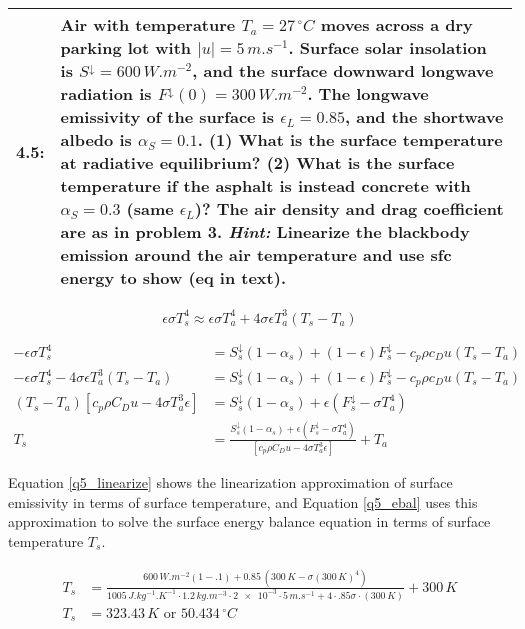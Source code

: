 \documentclass[12pt]{article}
\newcommand*{\problem}[2]{
    \begin{table}[ht]
    \centering
        \begin{tabular}{ | p{.1\linewidth} p{.9\linewidth} | }
            \hline
            \vspace{.3em}\textbf{\large#1:} & \vspace{.3em}\small{#2}\hspace{.2em}\vspace{.5em} \\ \hline
        \end{tabular}
    \end{table}
}
\begin{document}
\problem{4.5}{
    Air with temperature $T_a = 27\,^\circ\si{C}$ moves across a dry parking lot with $|u|=5\,\si{m.s^{-1}}$.
    Surface solar insolation is $S^\downarrow = 600\,\si{W.m^{-2}}$, and the surface downward longwave radiation is $F^\downarrow(0)=300\,\si{W.m^{-2}}$.
    The longwave emissivity of the surface is $\epsilon_L = 0.85$, and the shortwave albedo is $\alpha_S = 0.1$.
    \textbf{(1)} What is the surface temperature at radiative equilibrium?
    \textbf{(2)} What is the surface temperature if the asphalt is instead concrete with $\alpha_S = 0.3$ (same $\epsilon_L$)?
    The air density and drag coefficient are as in problem 3.
    \textit{Hint:} Linearize the blackbody emission around the air temperature and use sfc energy to show (eq in text).
    }%

\begin{equation}\label{q5_linearize}
    \epsilon\sigma T_s^4 \approx \epsilon\sigma T_a^4 + 4\sigma\epsilon T^3_a (T_s - T_a )
\end{equation}

\begin{equation}\label{q5_ebal}
    \begin{split}
        -\epsilon\sigma T_s^4 &= S_s^\downarrow (1-\alpha_s) + (1-\epsilon) F^\downarrow_s -  c_p\rho c_D u (T_s - T_a) \\
        -\epsilon\sigma T_s^4 - 4\sigma\epsilon T^3_a (T_s - T_a )&=  S_s^\downarrow (1-\alpha_s) + (1-\epsilon) F^\downarrow_s -  c_p\rho c_D u (T_s - T_a) \\
        (T_s - T_a )[c_p\rho C_D u - 4\sigma T^3_a \epsilon] &=  S_s^\downarrow (1-\alpha_s) + \epsilon (F^\downarrow_s - \sigma T_a^4) \\
        T_s &=  \frac{S_s^\downarrow (1-\alpha_s) + \epsilon (F^\downarrow_s - \sigma T_a^4)}{[c_p\rho C_D u - 4\sigma T^3_a \epsilon]} + T_a
    \end{split}
\end{equation}

Equation \ref{q5_linearize} shows the linearization approximation of surface emissivity in terms of surface temperature, and Equation \ref{q5_ebal}
uses this approximation to solve the surface energy balance equation in terms of surface temperature $T_s$.

\begin{equation}\label{q5_sol1}
    \begin{split}
        T_s &= \frac{600\,\si{W.m^{-2}}(1-.1)+0.85\,(300\,\si{K}-\sigma(300\,\si{K})^4)}{1005\,\si{J.kg^{-1}.K^{-1}}\cdot1.2\,\si{kg.m^{-3}}\cdot \num{2e-3} \cdot 5\,\si{m.s^{-1}} + 4\cdot .85\sigma\cdot(300\,\si{K})} + 300\,\si{K} \\
        T_s &= 323.43\,\si{K}\text{ or } 50.434\,^\circ\si{C} \\
    \end{split}
\end{equation}
\end{document}
